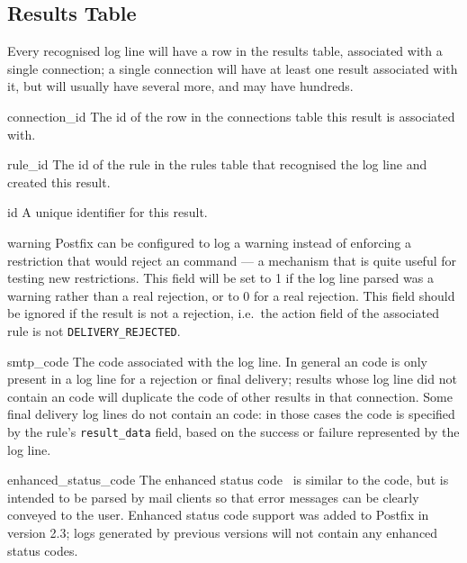 \subsection{Results Table}

\label{results table}

Every recognised log line will have a row in the results table, associated
with a single connection; a single connection will have at least one result
associated with it, but will usually have several more, and may have
hundreds.

\begin{boldeqlist}

    \item [connection\_id] The id of the row in the connections table this
        result is associated with.

    \item [rule\_id] The id of the rule in the rules table that recognised
        the log line and created this result.

    \item [id] A unique identifier for this result.

    \item [warning] Postfix can be configured to log a warning instead of
        enforcing a restriction that would reject an  command
        --- a mechanism that is quite useful for testing new restrictions.
        This field will be set to 1 if the log line parsed was a warning rather
        than a real rejection, or to 0 for a real rejection.  This field
        should be ignored if the result is not a rejection, i.e.\ the
        action field of the associated rule is not
        \texttt{DELIVERY\_REJECTED}.

    \item [smtp\_code] The  code associated with the log
        line.  In general an  code is only present in a log
        line for a rejection or final delivery; results whose log line did
        not contain an  code will duplicate the
         code of other results in that connection.  Some
        final delivery log lines do not contain an  code: in
        those cases the  code is specified by the rule's
        \texttt{result\_data} field, based on the success or failure
        represented by the log line.

    \item [enhanced\_status\_code] The enhanced status code~\cite{RFC3463}
        is similar to the  code, but is intended to be parsed
        by mail clients so that error messages can be clearly conveyed to
        the user.  Enhanced status code support was added to Postfix in
        version 2.3; logs generated by previous versions will not contain
        any enhanced status codes.


\end{boldeqlist}
